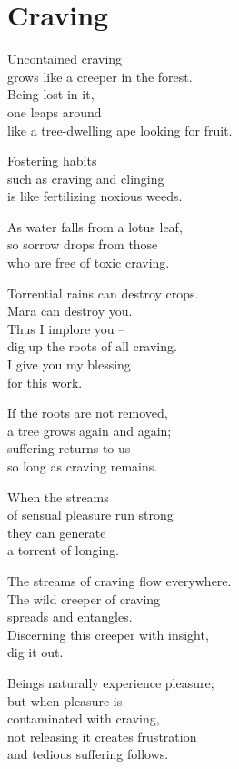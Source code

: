 
\chapter{Craving}


Uncontained craving\\
grows like a creeper in the forest.\\
Being lost in it,\\
one leaps around\\
like a tree-dwelling ape looking for fruit.


Fostering habits\\
such as craving and clinging\\
is like fertilizing noxious weeds.


As water falls from a lotus leaf,\\
so sorrow drops from those\\
who are free of toxic craving.


Torrential rains can destroy crops.\\
Mara can destroy you.\\
Thus I implore you --\\
dig up the roots of all craving.\\
I give you my blessing\\
for this work.


If the roots are not removed,\\
a tree grows again and again;\\
suffering returns to us\\
so long as craving remains.


When the streams\\
of sensual pleasure run strong\\
they can generate\\
a torrent of longing.


The streams of craving flow everywhere.\\
The wild creeper of craving\\
spreads and entangles.\\
Discerning this creeper with insight,\\
dig it out.


Beings naturally experience pleasure;\\
but when pleasure is\\
contaminated with craving,\\
not releasing it creates frustration\\
and tedious suffering follows.


